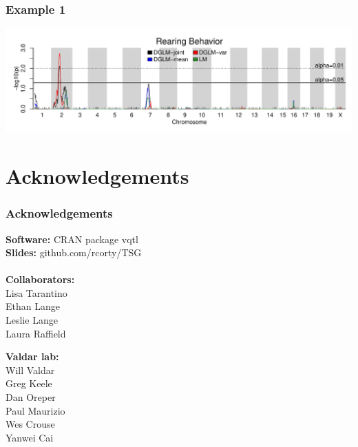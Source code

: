 \documentclass{beamer}
\begin{document}

\begin{frame}\frametitle{Example 1}

    \begin{center}
        \includegraphics[width = \textwidth]{manufig_rearing}
    \end{center}
    
\end{frame}

\section*{Acknowledgements}
\begin{frame}\frametitle{Acknowledgements}
    \begin{minipage}{0.45\textwidth}
        {\small
        \textbf{Software:} CRAN package vqtl\\
        \textbf{Slides:} github.com/rcorty/TSG\\\\
        \textbf{Collaborators:}\\
        Lisa Tarantino\\
        Ethan Lange\\
        Leslie Lange\\
        Laura Raffield}
    \end{minipage}\hfill
    \begin{minipage}{0.45\textwidth}
        {\small
        \textbf{Valdar lab:}\\
        Will Valdar\\
        Greg Keele\\
        Dan Oreper\\
        Paul Maurizio\\
        Wes Crouse\\
        Yanwei Cai}
    \end{minipage}
\end{frame}
\end{document}
